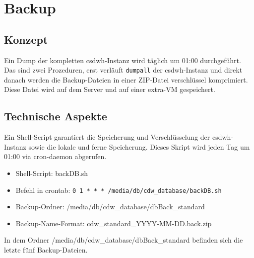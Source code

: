 \chapter{Backup}
\label{ch:back}
  \section{Konzept}
  Ein Dump der kompletten \ac{csdwh}-Instanz wird täglich um 01:00 durchgeführt. Das sind zwei Prozeduren, erst verläuft \texttt{dumpall} der \ac{csdwh}-Instanz und direkt danach werden die Backup-Dateien in einer ZIP-Datei verschlüssel komprimiert.
  Diese Datei wird auf dem Server und auf einer extra-VM gespeichert.
  \section{Technische Aspekte}
  Ein Shell-Script garantiert die Speicherung und Verschlüsselung der \ac{csdwh}-Instanz sowie die lokale und ferne Speicherung. Dieses Skript wird jeden Tag um 01:00 via cron-daemon abgerufen.
  
  \begin{itemize}
   \item Shell-Script: backDB.sh
   \item Befehl in crontab: \texttt{0 1 * * * /media/db/cdw\_database/backDB.sh}
   \item Backup-Ordner: /media/db/cdw\_database/dbBack\_standard
   \item Backup-Name-Format: cdw\_standard\_YYYY-MM-DD.back.zip
  \end{itemize}

In dem Ordner /media/db/cdw\_database/dbBack\_standard befinden sich die letzte fünf Backup-Dateien.